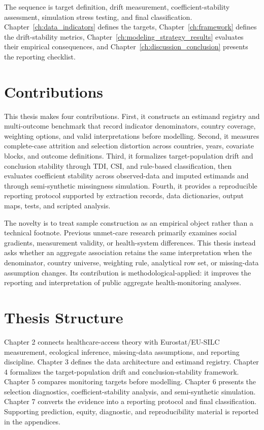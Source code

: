 The sequence is target definition, drift measurement, coefficient-stability assessment, simulation stress testing, and final classification. Chapter~\ref{ch:data_indicators} defines the targets, Chapter~\ref{ch:framework} defines the drift-stability metrics, Chapter~\ref{ch:modeling_strategy_results} evaluates their empirical consequences, and Chapter~\ref{ch:discussion_conclusion} presents the reporting checklist.

\section{Contributions}

This thesis makes four contributions. First, it constructs an estimand registry and multi-outcome benchmark that record indicator denominators, country coverage, weighting options, and valid interpretations before modelling. Second, it measures complete-case attrition and selection distortion across countries, years, covariate blocks, and outcome definitions. Third, it formalizes target-population drift and conclusion stability through TDI, CSI, and rule-based classification, then evaluates coefficient stability across observed-data and imputed estimands and through semi-synthetic missingness simulation. Fourth, it provides a reproducible reporting protocol supported by extraction records, data dictionaries, output maps, tests, and scripted analysis.

The novelty is to treat sample construction as an empirical object rather than a technical footnote. Previous unmet-care research primarily examines social gradients, measurement validity, or health-system differences. This thesis instead asks whether an aggregate association retains the same interpretation when the denominator, country universe, weighting rule, analytical row set, or missing-data assumption changes. Its contribution is methodological-applied: it improves the reporting and interpretation of public aggregate health-monitoring analyses.

\section{Thesis Structure}

Chapter 2 connects healthcare-access theory with Eurostat/EU-SILC measurement, ecological inference, missing-data assumptions, and reporting discipline. Chapter 3 defines the data architecture and estimand registry. Chapter 4 formalizes the target-population drift and conclusion-stability framework. Chapter 5 compares monitoring targets before modelling. Chapter 6 presents the selection diagnostics, coefficient-stability analysis, and semi-synthetic simulation. Chapter 7 converts the evidence into a reporting protocol and final classification. Supporting prediction, equity, diagnostic, and reproducibility material is reported in the appendices.
